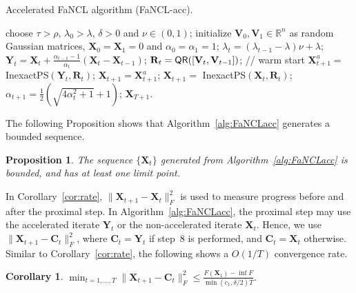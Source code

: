 \documentclass[10pt,journal,compsoc]{IEEEtran}
\newtheorem{prop}[theorem]{Proposition}
\newtheorem{corollary}[theorem]{Corollary}
\def \R{\mathbb R}
\newcommand{\X}{\mathbf{X}}
\newcommand{\NM}[2]{\| #1 \|_{#2} }
\newcommand{\QR}[1]{\text{\sf QR}( #1 )}
\newcommand{\f}[1]{f(#1)}
\begin{document}
\begin{algorithm}[ht]
	\caption{Accelerated FaNCL algorithm (\textsf{FaNCL-acc}).}
	\begin{algorithmic}[1]
		\REQUIRE choose $\tau > \rho$, $\lambda_0 > \lambda$, $\delta > 0$ and $\nu \in (0,1)$;
		\STATE initialize $\mathbf{V}_0, \mathbf{V}_1 \in \R^{n}$ as random Gaussian matrices, $\X_0 = \X_1 = 0$
		and $\alpha_0 = \alpha_1 = 1$;
		\STATE $\lambda_t = (\lambda_{t-1} -\lambda) \nu + \lambda$;
		\STATE $\mathbf{Y}_t = \X_t + \frac{\alpha_{t - 1} - 1}{\alpha_t}(\X_t - \X_{t - 1})$;
		\STATE $\mathbf{R}_t = \QR{[\mathbf{V}_t, \mathbf{V}_{t - 1}]}$; // warm start
		\STATE $\X^a_{t + 1} =$ \textsf{InexactPS}$(\mathbf{Y}_t, \mathbf{R}_t)$;
		\IF{$F(\X^a_{t + 1}) \le F(\X_t) - \frac{\delta}{2} \NM{\X^a_{t + 1} - \mathbf{Y}_t}{F}^2$}
		\STATE $\X_{t + 1} = \X^a_{t + 1}$;
		\ELSE
		\STATE $\X_{t + 1} =$ \textsf{InexactPS}$(\X_t, \mathbf{R}_t)$;
		\ENDIF
		\STATE $\alpha_{t + 1} = \frac{1}{2} (\sqrt{4\alpha_t^2 + 1} + 1)$;
		\ENDFOR 
		\RETURN $\X_{T + 1}$.
	\end{algorithmic}
	\label{alg:FaNCLacc}
\end{algorithm}


The following Proposition shows that Algorithm~\ref{alg:FaNCLacc} generates a bounded sequence.

\begin{prop} \label{pr:convacc}
	The sequence $\{\X_t\}$ generated from Algorithm~\ref{alg:FaNCLacc} is bounded,
	and has at least one limit point.
\end{prop}

In Corollary~\ref{cor:rate}, $\NM{\X_{t + 1} - \X_t}{F}^2$ is used to measure progress
before and after the proximal step.  In Algorithm~\ref{alg:FaNCLacc}, the
proximal step may use the accelerated iterate $\mathbf{Y}_t$ or the non-accelerated iterate
$\X_t$. Hence, we
use
$\| \X_{t+1} - \mathbf{C}_t \|_F^2$,
where
$\mathbf{C}_t = \mathbf{Y}_t$ if step~8 is performed, and $\mathbf{C}_t = \X_t$ otherwise.
Similar to Corollary~\ref{cor:rate},
the following shows a $O(1/T)$ convergence rate.

\begin{corollary} \label{cor:rateacc}
$\min_{t = 1, \dots, T} \NM{\X_{t + 1} - \mathbf{C}_t}{F}^2 \le \frac{F(\X_1) - \inf F}{\min(c_1, \delta/2) T}$. 
\end{corollary}
\end{document}
